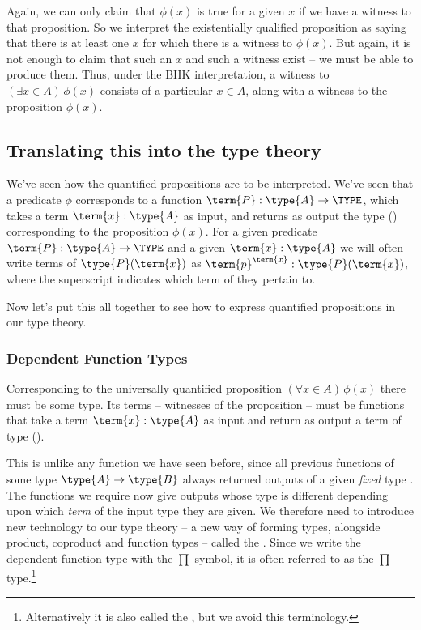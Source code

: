 Again, we can only claim that $\phi(x)$ is true for a given $x$ if we have a witness to that proposition.  So we interpret the existentially qualified proposition as saying that there is at least one $x$ for which there is a witness to $\phi(x)$.  But again, it is not enough to claim that such an $x$ and such a witness exist -- we must be able to produce them.  Thus, under the BHK interpretation, a witness to 
$(\exists x \in A)\, \phi(x)$
consists of a particular $x \in A$, along with a witness to the proposition $\phi(x)$.



\subsection{Translating this into the type theory}
\label{sec:Quantifiers-TranslatingToTypeTheory}

We've seen how the quantified propositions are to be interpreted.  We've seen that a predicate $\phi$ corresponds to a function $\term{P}:\type{A} \to \TYPE$, 
which takes a term 
$\term{x}:\type{A}$ 
as input, 
and returns as output the type () corresponding to the proposition $\phi(x)$.  For a given predicate $\term{P}:\type{A} \to \TYPE$ and a given $\term{x}:\type{A}$ we will often write terms of 
$\type{P}(\term{x})$ as 
$\term{p}^{\term{x}}:\type{P}(\term{x})$, 
where the superscript indicates which term of  they pertain to.


Now let's put this all together to see how to express quantified propositions in our type theory.




\subsubsection{Dependent Function Types}
\label{sec:Quantifiers-DependentFunctionTypes}

Corresponding to the universally quantified proposition 
$(\forall x \in A)\, \phi(x)$
there must be some type.  Its terms -- witnesses of the proposition -- must be functions that take
a term 
$\term{x}:\type{A}$ 
as input and return as output a term of type ().

This is unlike any function we have seen before, since all previous functions of some type $\type{A} \to \type{B}$ always returned outputs of a given \emph{fixed} type .  The functions we require now give outputs whose type is different depending upon which \emph{term} of the input type they are given.  We therefore need to introduce new technology to our type theory -- a new way of forming types, alongside product, coproduct and function types -- called the .  Since we write the dependent function type with the $\prod$ symbol, it is often referred to as the $\prod$-type.\footnote{
Alternatively it is also called the , but we avoid this terminology.
}

